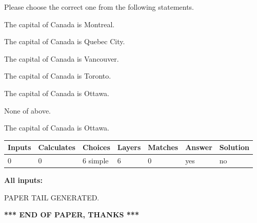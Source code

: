 \documentclass[12pt]{article}
\begin{document}
  
Please choose the correct one from the following statements.
 
 
The capital of Canada is Montreal.
 
 
The capital of Canada is Quebec City.
 
 
The capital of Canada is Vancouver.
 
 
The capital of Canada is Toronto.
 
 
The capital of Canada is Ottawa.
 
 
 None of above.
 
 
\noindent{}
 
 
The capital of Canada is Ottawa.
 
 
\noindent{}
 
 
   
   
   
   
\noindent\begin{tabular}{|l|l|l|l|l|l|l|}
 \hline
Inputs & Calculates & Choices & Layers & Matches & Answer & Solution \\ \hline
 0  & 
 0  & 
 6
  simple  
  & 
 6  & 
 0  & 
  yes & 
  no 
  \\ \hline
 \end{tabular}
   
   
   
   
\noindent{}
   
   
   
   
\noindent\vspace{0.1in}\hspace{-0.08in} {\textbf{\Large{All inputs: }}}
   
   
   
   
   
   
 \vspace{0.2in}
 
   
   
\vspace{2.0in} PAPER TAIL GENERATED.
   
   
   
   
\vspace{1.0in} 
{\textbf{\large{ *** END OF PAPER, THANKS *** }}} 
   
\end{document}
